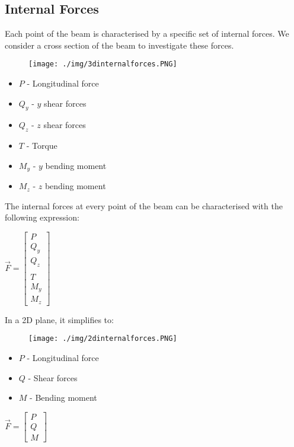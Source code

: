 \subsection{Internal Forces}
Each point of the beam is characterised by a specific set of internal forces. We consider a cross section of the beam to investigate these forces.
\begin{figure}[H]
  \centering
  \texttt{[image: ./img/3dinternalforces.PNG]}
\end{figure}
\begin{itemize}[noitemsep]
  \item $P$ - Longitudinal force
  \item $Q_y$ - $y$ shear forces
  \item $Q_z$ - $z$ shear forces
  \item $T$ - Torque
  \item $M_y$ - $y$ bending moment
  \item $M_z$ - $z$ bending moment
\end{itemize}
The internal forces at every point of the beam can be characterised with the following expression:
\begin{center}
  $\vec{F} = \left[ \begin{array}{ccccccc} P \\ Q_y \\ Q_z \\ \\ T \\ M_y \\ M_z \end{array}\right]$
\end{center}
In a 2D plane, it simplifies to:
\begin{figure}[H]
  \centering
  \texttt{[image: ./img/2dinternalforces.PNG]}
\end{figure}
\begin{itemize}[noitemsep]
  \item $P$ - Longitudinal force
  \item $Q$ - Shear forces
  \item $M$ - Bending moment
\end{itemize}
\begin{center}
  $\vec{F} = \left[ \begin{array}{ccccccc} P \\ Q \\ M \end{array}\right]$
\end{center}
